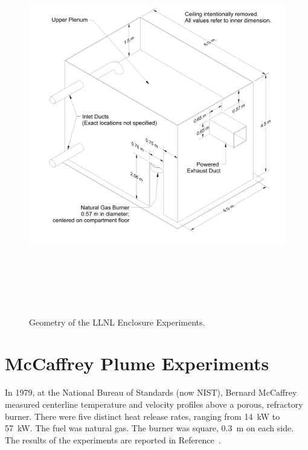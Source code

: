 \begin{figure}
\begin{center}
\includegraphics[height=6.5in]{FIGURES/LLNL_Enclosure/LLNL_Enclosure_Drawing}
\end{center}
\caption[Geometry of the LLNL Enclosure Experiments]{Geometry of the LLNL Enclosure Experiments.}
\label{LLNL_Enclosure_Drawing}
\end{figure}


\section{McCaffrey Plume Experiments}

In 1979, at the National Bureau of Standards (now NIST), Bernard McCaffrey measured centerline temperature and velocity profiles above a porous, refractory burner.
There were five distinct heat release rates, ranging from 14~kW to 57~kW. The fuel was natural gas. The burner was square, 0.3~m on each side.
The results of the experiments are reported in Reference~\cite{McCaffrey:NBSIR_79-1910}.


